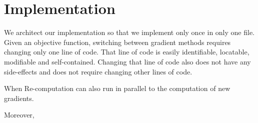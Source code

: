 \section{Implementation}

We architect our implementation so that we implement \tool only once in only one file.
Given an objective function, switching between gradient methods requires changing only one line of code.
That line of code is easily identifiable, locatable, modifiable and self-contained.
Changing that line of code also does not have any side-effects and does not require changing other lines of code.

When 
Re-computation can also run in parallel to the computation of new gradients.  

Moreover, 